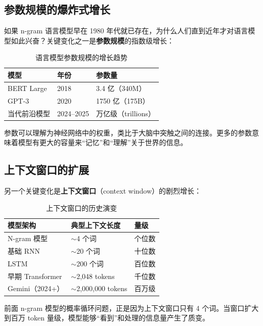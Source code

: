 \documentclass[a4paper]{article}
\begin{document}
\subsection{参数规模的爆炸式增长}

如果 n-gram 语言模型早在 1980 年代就已存在，为什么人们直到近年才对语言模型如此兴奋？关键变化之一是\textbf{参数规模}的指数级增长：

\begin{table}[H]
\centering
\begin{tabular}{lll}
\toprule
\textbf{模型} & \textbf{年份} & \textbf{参数量} \\
\midrule
BERT Large     & 2018 & 3.4 亿（340M）  \\
GPT-3          & 2020 & 1750 亿（175B） \\
当代前沿模型   & 2024--2025 & 万亿级（trillions） \\
\bottomrule
\end{tabular}
\caption{语言模型参数规模的增长趋势}
\end{table}

参数可以理解为神经网络中的权重，类比于大脑中突触之间的连接。更多的参数意味着模型有更大的容量来``记忆''和``理解''关于世界的信息。

\subsection{上下文窗口的扩展}

另一个关键变化是\textbf{上下文窗口}（context window）的剧烈增长：

\begin{table}[H]
\centering
\begin{tabular}{lll}
\toprule
\textbf{模型架构} & \textbf{典型上下文长度} & \textbf{量级} \\
\midrule
N-gram 模型       & $\sim$4 个词          & 个位数 \\
基础 RNN           & $\sim$20 个词         & 十位数 \\
LSTM               & $\sim$200 个词        & 百位数 \\
早期 Transformer   & $\sim$2,048 tokens    & 千位数 \\
Gemini（2024+）    & $\sim$2,000,000 tokens & 百万级 \\
\bottomrule
\end{tabular}
\caption{上下文窗口的历史演变}
\end{table}

前面 n-gram 模型的概率循环问题，正是因为上下文窗口只有 4 个词。当窗口扩大到百万 token 量级，模型能够``看到''和处理的信息量产生了质变。
\end{document}
